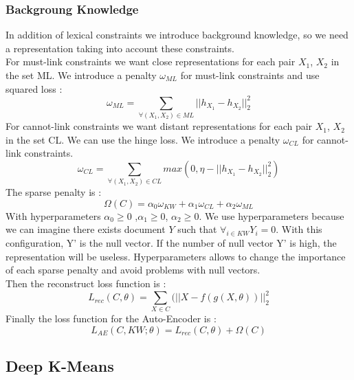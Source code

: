\subsubsection{Backgroung Knowledge}
In addition of lexical constraints we introduce background knowledge, so we need
a representation taking into account these constraints.\\
For must-link constraints we want close representations for each pair $X_1$, $X_2$
in the set ML. We introduce a penalty $\omega_{ML}$ for must-link
constraints and use squared loss :
\begin{equation}\label{eq:omegaML}
  \omega_{ML} = \sum_{\forall{(X_1,X_2)\in ML}} || h_{X_1} - h_{X_2} ||_2^2
\end{equation}
For cannot-link constraints we want distant representations for each pair $X_1$,
$X_2$ in the set CL.
We can use the hinge loss.
We introduce a penalty $\omega_{CL}$ for cannot-link constraints.
\begin{equation}\label{eq:omegaCL}
  \omega_{CL} = \sum_{\forall{(X_1,X_2)\in CL}} max(0,
  \eta - || h_{X_1} - h_{X_2} ||_2^2)
\end{equation}
The sparse penalty is :
\begin{equation}\label{eq:Sparse}
  \Omega(C) = \alpha_0\omega_{KW} + \alpha_1\omega_{CL} + \alpha_2\omega_{ML}  
\end{equation}
With hyperparameters $\alpha_0\geq 0$ ,$\alpha_1\geq 0$, $\alpha_2\geq 0$. We use
hyperparameters because we can imagine there exists document $Y$ such that
$\forall_{i \in KW} Y_i = 0$. With this configuration, Y' is the null vector. If the
number of null vector Y' is high, the representation will be useless.
Hyperparameters allows to change the importance of each sparse penalty
and avoid problems with null vectors.\\
Then the reconstruct loss function is :
\begin{equation}\label{eq:AEDK}
  L_{rec}(C, \theta) = \sum_{X \in C}(||X - f(g(X, \theta))||_2^2
\end{equation}
Finally the loss function for the Auto-Encoder is :
\begin{equation}\label{eq:AE}
  L_{AE}(C,KW; \theta) = L_{rec}(C, \theta) + \Omega(C)  
\end{equation}

\subsection{Deep K-Means}

